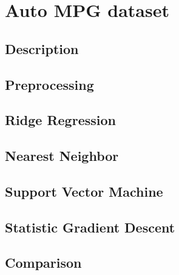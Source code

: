 \section{Auto MPG dataset}
\subsection{Description}
\subsection{Preprocessing}
\subsection{Ridge Regression}
\subsection{Nearest Neighbor}
\subsection{Support Vector Machine}
\subsection{Statistic Gradient Descent}
\subsection{Comparison}

